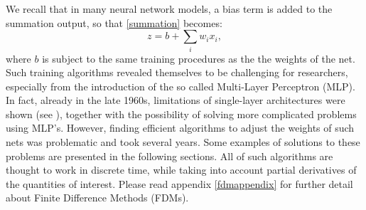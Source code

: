 \documentclass[%
    corpo=11pt,
    twoside,
    stile=classica,
    oldstyle,
    autoretitolo,
    tipotesi=magistrale,
    greek,
    evenboxes,
    english
]{toptesi}
\begin{document}
We recall that in many neural network models, a bias term is added to the summation output, so that \eqref{summation} becomes:
\begin{equation}
z = b + \sum_{i}w_i x_i,
\end{equation}
where $b$ is subject to the same training procedures as the the weights of the net. \\ Such training algorithms revealed themselves to be challenging for researchers, especially from the introduction of the so called Multi-Layer Perceptron (MLP). In fact, already in the late 1960s, limitations of single-layer architectures were shown (see \cite{minpapert}), together with the possibility of solving more complicated problems using MLP's. However, finding efficient algorithms to adjust the weights of such nets was problematic and took several years. Some examples of solutions to these problems are presented in the following sections. All of such algorithms are thought to work in discrete time, while taking into account partial derivatives of the quantities of interest. Please read appendix \ref{fdmappendix} for further detail about Finite Difference Methods (FDMs).
\end{document}
